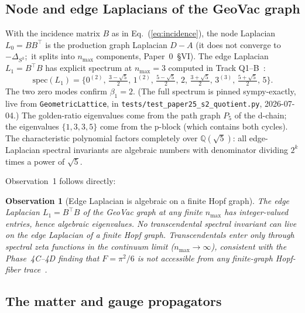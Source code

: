 \documentclass[aps,pra,twocolumn,superscriptaddress,longbibliography]{revtex4-2}
\newtheorem{observation}{Observation}
\begin{document}
\subsection{Node and edge Laplacians of the GeoVac graph}

With the incidence matrix $B$ as in Eq.~(\ref{eq:incidence}), the
node Laplacian $L_0 = B B^{\top}$ is the production graph Laplacian
$D - A$ (it does not converge to $-\Delta_{S^3}$;\ it splits into
$n_{\max}$ components, Paper~0~\S VI).  The edge Laplacian
$L_1 = B^{\top} B$ has explicit spectrum at $n_{\max} = 3$
computed in Track Q1--B~\cite{Q1B}:
\begin{equation}
\mathrm{spec}(L_1) = \{0^{(2)},\, \tfrac{3-\sqrt{5}}{2},\, 1^{(2)},\,
  \tfrac{5-\sqrt{5}}{2},\, 2,\, \tfrac{3+\sqrt{5}}{2},\, 3^{(3)},\,
  \tfrac{5+\sqrt{5}}{2},\, 5\}.
\label{eq:L1_spectrum}
\end{equation}
The two zero modes confirm $\beta_1 = 2$.  (The full spectrum is
pinned sympy-exactly, live from \texttt{GeometricLattice}, in
\texttt{tests/test\_paper25\_s2\_quotient.py}, 2026-07-04.)  The
golden-ratio
eigenvalues come from the path graph $P_5$ of the d-chain; the
eigenvalues $\{1, 3, 3, 5\}$ come from the p-block (which contains
both cycles).  The characteristic polynomial factors completely over
$\mathbb{Q}(\sqrt{5})$: all edge-Laplacian spectral invariants are
algebraic numbers with denominator dividing $2^k$ times a power of
$\sqrt{5}$.

Observation~1 follows directly:

\begin{observation}[Edge Laplacian is algebraic on a finite
    Hopf graph]
\label{obs:edge_algebraic}
The edge Laplacian $L_1 = B^{\top} B$ of the GeoVac graph at any
finite $n_{\max}$ has integer-valued entries, hence algebraic
eigenvalues.  No transcendental spectral invariant can live on the
edge Laplacian of a finite Hopf graph.  Transcendentals enter only
through spectral zeta functions in the continuum limit
($n_{\max} \to \infty$), consistent with the Phase~4C--4D finding
that $F = \pi^2/6$ is not accessible from any finite-graph
Hopf-fiber trace~\cite{Paper2}.
\end{observation}

\subsection{The matter and gauge propagators}
\end{document}
